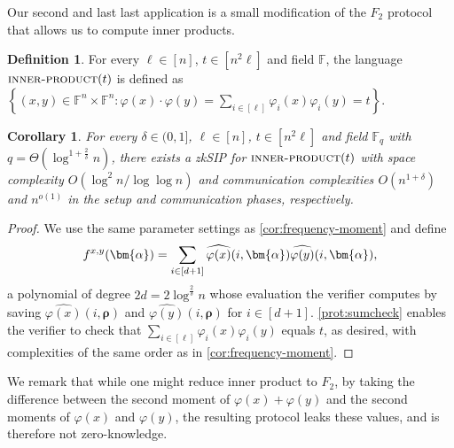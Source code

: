 \documentclass[10pt,a4paper]{article}
\newtheorem{corollary}[theorem]{Corollary}
\theoremstyle{definition}
\newtheorem{definition}[theorem]{Definition}
\newcommand{\zksip}{\textrm{zkSIP}}
\newcommand{\field}{\mathbb{F}}
\renewcommand{\set}[1]{\left\{#1\right\}}
\newcommand{\innerproductproblem}{\normalfont\textsc{inner-product}\xspace}
\newcommand{\degree}{d}
\newcommand{\fieldsize}{q}
\newcommand{\fingerprinttuple}{\bm{\rho}}
\def\fe#1{
    \ifnum#1=1
        \alpha
    \else
    \ifnum#1=2
        \beta
    \else
    \ifnum#1=3
        \gamma
    \fi\fi\fi
}
\begin{document}
Our second and last last application is a small modification of the $F_2$ protocol that allows us to compute inner products.
\begin{definition}
    \label{def:inner-product}
    For every $\ell \in [n]$, $t \in [n^2 \ell]$ and field $\field$, the language $\innerproductproblem(t)$ is defined as $\set{(x,y) \in \field^n \times \field^n : \varphi(x) \cdot \varphi(y) = \sum_{i \in [\ell]} \varphi_i(x) \varphi_i(y) = t}$.
\end{definition}

\begin{corollary}
    \label{cor:inner-product}
    For every $\delta \in (0, 1]$, $\ell \in [n]$, $t \in [n^2 \ell]$ and field $\field_\fieldsize$ with $\fieldsize = \Theta\left(\log^{1 + \frac{2}{\delta}} n\right)$, there exists a \zksip{} for $\innerproductproblem(t)$ with space complexity $O(\log^2 n / \log\log n)$ and communication complexities $O(n^{1 + \delta})$ and $n^{o(1)}$ in the setup and communication phases, respectively.
\end{corollary}
\begin{proof}
    We use the same parameter settings as \cref{cor:frequency-moment} and define
    \begin{equation*}
        f^{x,y}(\bm{\fe1}) = \sum_{i \in [\degree + 1]} \widehat{\varphi(x)}(i, \bm{\fe1}) \widehat{\varphi(y)}(i, \bm{\fe1}),
    \end{equation*}
    a polynomial of degree $2\degree = 2\log^{\frac{2}{\delta}} n$ whose evaluation the verifier computes by saving $\widehat{\varphi(x)}(i,\fingerprinttuple)$ and $\widehat{\varphi(y)}(i,\fingerprinttuple)$ for $i \in [\degree + 1]$. \cref{prot:sumcheck} enables the verifier to check that $\sum_{i \in [\ell]} \varphi_i(x) \varphi_i(y)$ equals $t$, as desired, with complexities of the same order as in \cref{cor:frequency-moment}.
\end{proof}

We remark that while one might reduce inner product to $F_2$, by taking the difference between the second moment of $\varphi(x) + \varphi(y)$ and the second moments of $\varphi(x)$ and $\varphi(y)$, the resulting protocol leaks these values, and is therefore not zero-knowledge.
    
\end{document}
